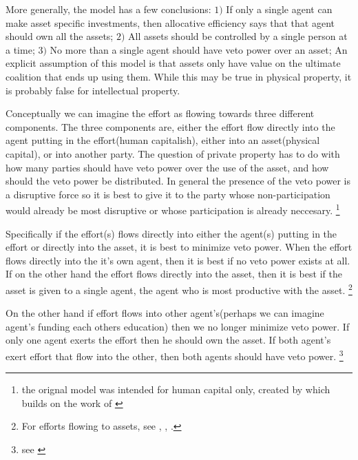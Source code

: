 \documentclass[12pt]{article}
\numberwithin{equation}{section}
\begin{document}
More generally, the model has a few conclusions: $1)$ If only a single agent can make asset specific investments, then allocative efficiency says that that agent should own all the assets; $2)$ All assets should be controlled by a single person at a time; $3)$ No more than a single agent should have veto power over an asset; An explicit assumption of this model is that assets only have value on the ultimate coalition that ends up using them. While this may be true in physical property, it is probably false for intellectual property. 

Conceptually we can imagine the effort as flowing towards three different components. The three components are, either the effort flow directly into the agent putting in the effort(human capitalish), either into an asset(physical capital), or into another party. The question of private property has to do with how many parties should have veto power over the use of the asset, and how should the veto power be distributed. In general the presence of the veto power is a disruptive force so it is best to give it to the party whose non-participation would already be most disruptive or whose participation is already neccesary. \footnote{the orignal model was intended for human capital only, created by \cite{Hart1990} which builds on the work of \cite{Grossman1986} }

Specifically if the effort(s) flows directly into either the agent(s) putting in the effort or directly into the asset, it is best to minimize veto power. When the effort flows directly into the it's own agent, then it is best if no veto power exists at all. If on the other hand the effort flows directly into the asset, then it is best if the asset is given to a single agent, the agent who is most productive with the asset. \footnote{For efforts flowing to assets, see \cite{schmitz2013investments}, \citet{gattai2016investment}, \cite{schmitz2017incomplete}. }

On the other hand if effort flows into other agent's(perhaps we can imagine agent's funding each others education) then we no longer minimize veto power. If only one agent exerts the effort then he should own the asset. If both agent's exert effort that flow into the other, then both agents should have veto power. \footnote{see \cite{hamada2011incentive}}
\end{document}
